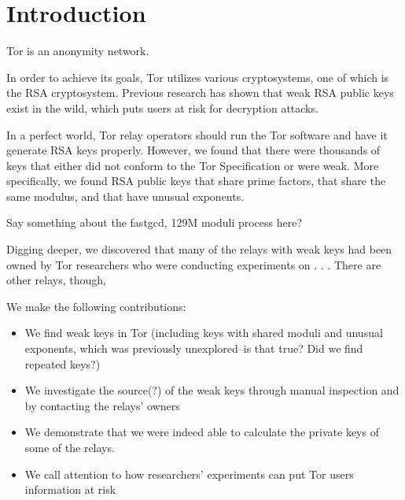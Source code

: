 \section{Introduction}
Tor is an anonymity network.  

In order to achieve its goals, Tor utilizes various cryptosystems, 
one of which is the RSA cryptosystem.  Previous research has 
shown that weak RSA public keys exist in the wild, which puts users at 
risk for decryption attacks.  

In a perfect world, Tor relay operators should run the Tor software and have it 
generate RSA keys properly. However, we found that there were thousands of keys 
that either did not conform to the Tor Specification or were weak.  More 
specifically, we found RSA public keys that share prime factors, 
that share the same modulus, and that have unusual exponents.

Say something about the fastgcd, 129M moduli process here?

Digging deeper, we discovered that many of the relays with weak keys had been owned 
by Tor researchers who were conducting experiments on . . . There are other 
relays, though, 

We make the following contributions:
\begin{itemize}
  \item We find weak keys in Tor (including keys with shared moduli 
    and unusual exponents, which was previously unexplored--is that true?
    Did we find repeated keys?)
  \item We investigate the source(?) of the weak keys through manual inspection and by 
    contacting the relays' owners
  \item We demonstrate that we were indeed able to calculate the private keys of 
    some of the relays.
  \item We call attention to how researchers' experiments can put Tor users
    information at risk
\end{itemize}
